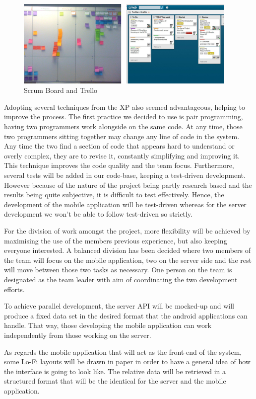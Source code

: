 \begin{figure}[here]
\begin{minipage}{\textwidth}
\begin{center}
\includegraphics[width=0.95\textwidth]{images/scrumboard.jpg}
\end{center}
\vspace{-20pt}
\caption[Caption for LOF]{Scrum Board and Trello\footnotemark}
\end{minipage} 
\end{figure}

Adopting several techniques from the XP also seemed advantageous, helping to
improve the process. The first practice we decided to use is pair programming,
having two programmers work alongside on the same code. At any time, those two
programmers sitting together may change any line of code in the system. Any
time the two find a section of code that appears hard to understand or overly
complex, they are to revise it, constantly simplifying and improving it. This
technique improves the code quality and the team focus. Furthermore, several
tests will be added in our code-base, keeping a test-driven development.
However because of the nature of the project being partly research based and
the results being quite subjective, it is difficult to test effectively. Hence,
the development of the mobile application will be test-driven whereas for the
server development we won't be able to follow test-driven so strictly.\cite{Cockburn}

For the division of work amongst the project, more flexibility will be achieved by maximising the use of the members previous experience, but also keeping everyone interested. A balanced division has been decided where two members of the team will focus on the mobile application, two on the server side and the rest will move between those two tasks as necessary. One person on the team is designated as the team leader with aim of coordinating the two development efforts.  

To achieve parallel development, the server API will be mocked-up and will produce a fixed data set in the desired format that the android applications can handle. That way, those developing the mobile application can work independently from those working on the server.

As regards the mobile application that will act as the front-end of the system, some Lo-Fi layouts will be drawn in paper in order to have a general idea of how the interface is going to look like. The relative data will be retrieved in a structured format that will be the identical for the server and the mobile application.


